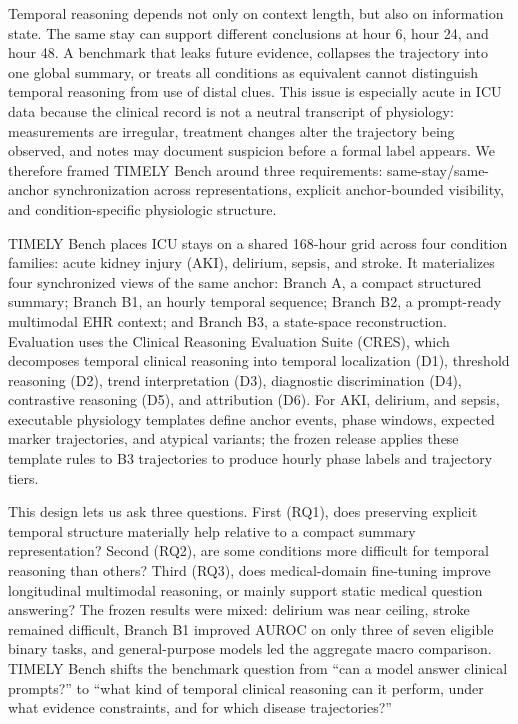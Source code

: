 \documentclass[pdflatex,sn-nature]{sn-jnl}
\begin{document}
Temporal reasoning depends not only on context length, but also on information state. The same stay can support different conclusions at hour 6, hour 24, and hour 48. A benchmark that leaks future evidence, collapses the trajectory into one global summary, or treats all conditions as equivalent cannot distinguish temporal reasoning from use of distal clues. This issue is especially acute in ICU data because the clinical record is not a neutral transcript of physiology: measurements are irregular, treatment changes alter the trajectory being observed, and notes may document suspicion before a formal label appears. We therefore framed TIMELY Bench around three requirements: same-stay/same-anchor synchronization across representations, explicit anchor-bounded visibility, and condition-specific physiologic structure.

TIMELY Bench places ICU stays on a shared 168-hour grid across four condition families: acute kidney injury (AKI), delirium, sepsis, and stroke. It materializes four synchronized views of the same anchor: Branch A, a compact structured summary; Branch B1, an hourly temporal sequence; Branch B2, a prompt-ready multimodal EHR context; and Branch B3, a state-space reconstruction. Evaluation uses the Clinical Reasoning Evaluation Suite (CRES), which decomposes temporal clinical reasoning into temporal localization (D1), threshold reasoning (D2), trend interpretation (D3), diagnostic discrimination (D4), contrastive reasoning (D5), and attribution (D6). For AKI, delirium, and sepsis, executable physiology templates define anchor events, phase windows, expected marker trajectories, and atypical variants; the frozen release applies these template rules to B3 trajectories to produce hourly phase labels and trajectory tiers.

This design lets us ask three questions. First (RQ1), does preserving explicit temporal structure materially help relative to a compact summary representation? Second (RQ2), are some conditions more difficult for temporal reasoning than others? Third (RQ3), does medical-domain fine-tuning improve longitudinal multimodal reasoning, or mainly support static medical question answering? The frozen results were mixed: delirium was near ceiling, stroke remained difficult, Branch B1 improved AUROC on only three of seven eligible binary tasks, and general-purpose models led the aggregate macro comparison. TIMELY Bench shifts the benchmark question from ``can a model answer clinical prompts?'' to ``what kind of temporal clinical reasoning can it perform, under what evidence constraints, and for which disease trajectories?''
\end{document}
